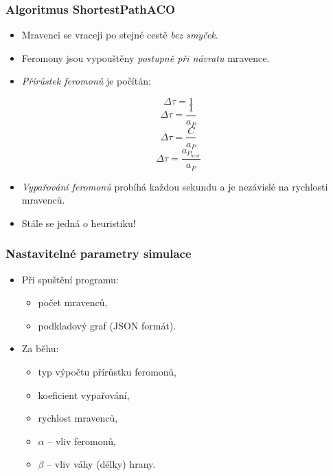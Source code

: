 \documentclass[10pt,xcolor=pdflatex,hyperref={unicode}]{beamer}
\begin{document}
\begin{frame}
\frametitle{Algoritmus ShortestPathACO}
    \doublespacing
    \begin{itemize}    
        \item Mravenci se vracejí po stejné cestě \emph{bez smyček}.
        \item Feromony jsou vypouštěny \emph{postupně při návratu} mravence.
        \item \emph{Přírůstek feromonů} je počítán:
    \end{itemize}

    \begin{multicols}{4}
    \noindent
    \begin{equation*}
    \Delta \tau = 1
    \end{equation*}\notag
    \begin{equation*}
    \Delta \tau = \frac{1}{a_P}
    \end{equation*}\notag
    \begin{equation*}
    \Delta \tau = \frac{C}{a_P}
    \end{equation*}\notag
    \begin{equation*}
    \Delta \tau = \frac{a_{P_{best}}}{a_P}
    \end{equation*}\notag
    \end{multicols}

    \singlespacing
    \begin{itemize}
        \item \emph{Vypařování feromonů} probíhá každou sekundu a je nezávislé na rychlosti mravenců.
    \end{itemize}

    \doublespacing
    \begin{itemize}
        \item Stále se jedná o \alert{heuristiku}!
    \end{itemize}
\end{frame}

\begin{frame}
\frametitle{Nastavitelné parametry simulace}
\doublespacing
    \begin{itemize}
        \item Při spuštění programu:
        \begin{itemize}
            \item počet mravenců,
            \item podkladový graf (JSON formát).
        \end{itemize}
        \item Za běhu:
        \begin{itemize}
            \item typ výpočtu přírůstku feromonů,
            \item koeficient vypařování,
            \item rychlost mravenců,
            \item $\alpha$ -- vliv feromonů,
            \item $\beta$ -- vliv váhy (délky) hrany.
        \end{itemize}
    \end{itemize}
\end{frame}


\end{document}
